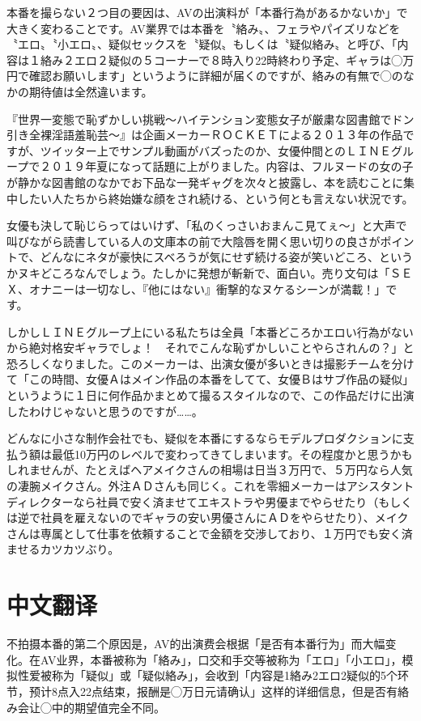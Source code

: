 \documentclass[12pt,UTF8]{ctexbook}
\begin{document}
本番を撮らない２つ目の要因は、AVの出演料が「本番行為があるかないか」で大きく変わることです。AV業界では本番を〝絡み〟、フェラやパイズリなどを〝エロ〟〝小エロ〟、疑似セックスを〝疑似〟もしくは〝疑似絡み〟と呼び、「内容は１絡み２エロ２疑似の５コーナーで８時入り22時終わり予定、ギャラは◯万円で確認お願いします」というように詳細が届くのですが、絡みの有無で◯のなかの期待値は全然違います。

『世界一変態で恥ずかしい挑戦〜ハイテンション変態女子が厳粛な図書館でドン引き全裸淫語羞恥芸〜』は企画メーカーＲＯＣＫＥＴによる２０１３年の作品ですが、ツイッター上でサンプル動画がバズったのか、女優仲間とのＬＩＮＥグループで２０１９年夏になって話題に上がりました。内容は、フルヌードの女の子が静かな図書館のなかでお下品な一発ギャグを次々と披露し、本を読むことに集中したい人たちから終始嫌な顔をされ続ける、という何とも言えない状況です。

女優も決して恥じらってはいけず、「私のくっさいおまんこ見てぇ〜」と大声で叫びながら読書している人の文庫本の前で大陰唇を開く思い切りの良さがポイントで、どんなにネタが豪快にスベろうが気にせず続ける姿が笑いどころ、というかヌキどころなんでしょう。たしかに発想が斬新で、面白い。売り文句は「ＳＥＸ、オナニーは一切なし、『他にはない』衝撃的なヌケるシーンが満載！」です。

しかしＬＩＮＥグループ上にいる私たちは全員「本番どころかエロい行為がないから絶対格安ギャラでしょ！　それでこんな恥ずかしいことやらされんの？」と恐ろしくなりました。このメーカーは、出演女優が多いときは撮影チームを分けて「この時間、女優Ａはメイン作品の本番をしてて、女優Ｂはサブ作品の疑似」というように１日に何作品かまとめて撮るスタイルなので、この作品だけに出演したわけじゃないと思うのですが……。

どんなに小さな制作会社でも、疑似を本番にするならモデルプロダクションに支払う額は最低10万円のレベルで変わってきてしまいます。その程度かと思うかもしれませんが、たとえばヘアメイクさんの相場は日当３万円で、５万円なら人気の凄腕メイクさん。外注ＡＤさんも同じく。これを零細メーカーはアシスタントディレクターなら社員で安く済ませてエキストラや男優までやらせたり（もしくは逆で社員を雇えないのでギャラの安い男優さんにＡＤをやらせたり）、メイクさんは専属として仕事を依頼することで金額を交渉しており、１万円でも安く済ませるカツカツぶり。

\switchcolumn

\section*{中文翻译}

不拍摄本番的第二个原因是，AV的出演费会根据「是否有本番行为」而大幅变化。在AV业界，本番被称为「絡み」，口交和手交等被称为「エロ」「小エロ」，模拟性爱被称为「疑似」或「疑似絡み」，会收到「内容是1絡み2エロ2疑似的5个环节，预计8点入22点结束，报酬是◯万日元请确认」这样的详细信息，但是否有絡み会让◯中的期望值完全不同。
\end{document}
